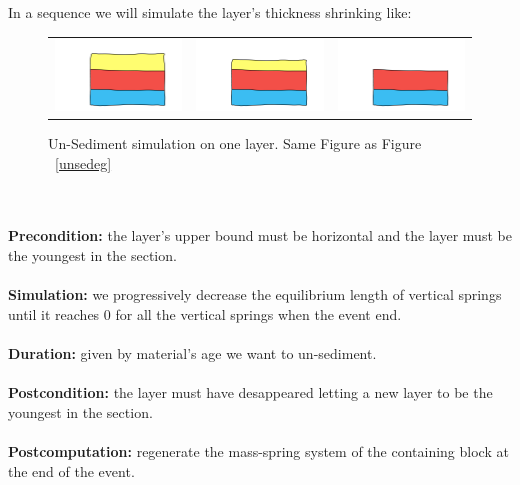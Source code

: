 \documentclass[12pt, a4paper]{report} %
\begin{document}
In a sequence we will simulate the layer's thickness shrinking like:
\begin{figure}[htb]
\centering
\begin{tabular}{@{}ccc@{}}
\includegraphics[width=.35\textwidth]{unSedimentDescription0.png}&
\includegraphics[width=.35\textwidth]{unSedimentDescription1.png}&
\includegraphics[width=.35\textwidth]{unSedimentDescription2.png}\\
\end{tabular}
\caption{Un-Sediment simulation on one layer. Same Figure as Figure ~\ref{unsedeg}}
\label{unsedeg2}
\end{figure}\\\\
\textbf{Precondition:} the layer's upper bound must be horizontal and the layer must be the youngest in the section.\\\\
\textbf{Simulation:} we progressively decrease the equilibrium length of vertical springs until it reaches $0$ for all the vertical springs when the event end.\\\\
\textbf{Duration:} given by material's age we want to un-sediment.\\\\
\textbf{Postcondition:} the layer must have desappeared letting a new layer to be the youngest 
in the section.\\\\
\textbf{Postcomputation:} regenerate the mass-spring system of the containing block at the end of the event.\\\\
\end{document}

